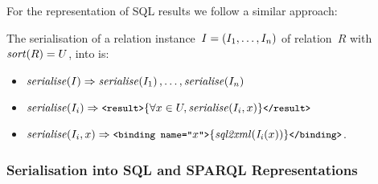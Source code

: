 For the representation of \ac{SQL} results we follow a similar approach:
%
\begin{definition}
  \label{lem:relation2types}
  The serialisation of a relation instance~$I = \left(I_1, \ldots, I_n\right)$ of relation~$R$ with~$\mathit{sort}\!\left(R\right) = U$,
  into  is:
  \begin{itemize}[noitemsep]
  \item $\mathit{serialise}\!\left(I\right) \Rightarrow \mathit{serialise}\!\left(I_1\right), \ldots, \mathit{serialise}\!\left(I_n\right)$
  \item $\mathit{serialise}\!\left(I_i\right) \Rightarrow
    \texttt{{\small <result>}} \{\forall x \in U, \mathit{serialise}\!\left(I_i, x\right)\} \texttt{{\small </result>}}
    $
  \item $\mathit{serialise}\!\left(I_i, x\right) \Rightarrow  
    \texttt{{\small <binding name="}}x\texttt{{\small ">}} \{ \mathit{sql2xml}\!\left(\mathit{I_i}\!\left(x\right)\right) \} \texttt{{\small </binding>}}
    $.
  \end{itemize}
\end{definition}



\subsubsection{Serialisation into SQL and SPARQL Representations}
\label{sec:sql-sparql-serialisation}

